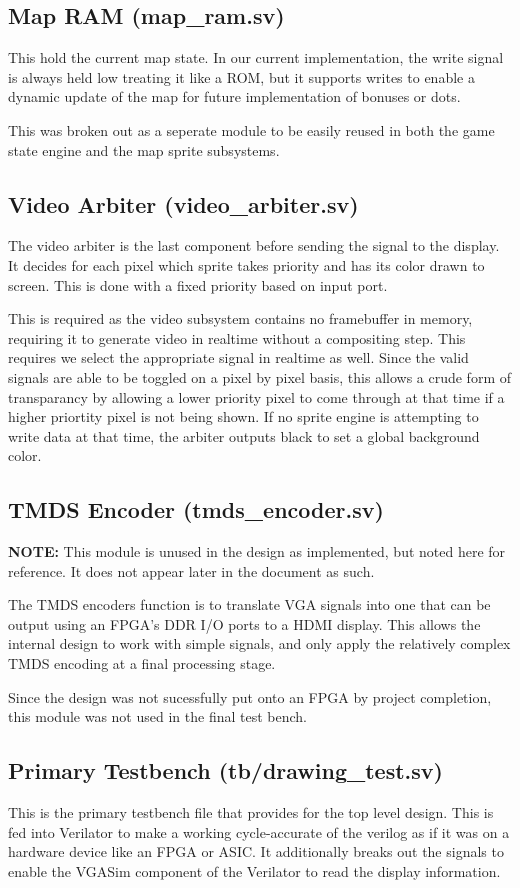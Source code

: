 \documentclass[12pt]{article}
\begin{document}
\subsection{Map RAM (map\_ram.sv)}
This hold the current map state. In our current implementation, the write signal
is always held low treating it like a ROM, but it supports writes to enable a
dynamic update of the map for future implementation of bonuses or dots.

This was broken out as a seperate module to be easily reused in both the game
state engine and the map sprite subsystems.

\subsection{Video Arbiter (video\_arbiter.sv)}
The video arbiter is the last component before sending the signal to the
display. It decides for each pixel which sprite takes priority and has its color
drawn to screen. This is done with a fixed priority based on input port.

This is required as the video subsystem contains no framebuffer in memory,
requiring it to generate video in realtime without a compositing step. This
requires we select the appropriate signal in realtime as well. Since the valid
signals are able to be toggled on a pixel by pixel basis, this allows a crude
form of transparancy by allowing a lower priority pixel to come through at that
time if a higher priortity pixel is not being shown. If no sprite engine is
attempting to write data at that time, the arbiter outputs black to set a global
background color.

\subsection{TMDS Encoder (tmds\_encoder.sv)}
\textbf{NOTE:} This module is unused in the design as implemented, but noted here for reference. It does
not appear later in the document as such.

The TMDS encoders function is to translate VGA signals into one that can be
output using an FPGA's DDR I/O ports to a HDMI display. This allows the internal
design to work with simple signals, and only apply the relatively complex TMDS
encoding at a final processing stage.

Since the design was not sucessfully put onto an FPGA by project completion, this module was not used in the final
test bench.

\subsection{Primary Testbench (tb/drawing\_test.sv)}
This is the primary testbench file that provides for the top level design. This
is fed into Verilator to make a working cycle-accurate of the verilog as if it
was on a hardware device like an FPGA or ASIC. It additionally breaks out the
signals to enable the VGASim component of the Verilator to read the display information.
\end{document}
